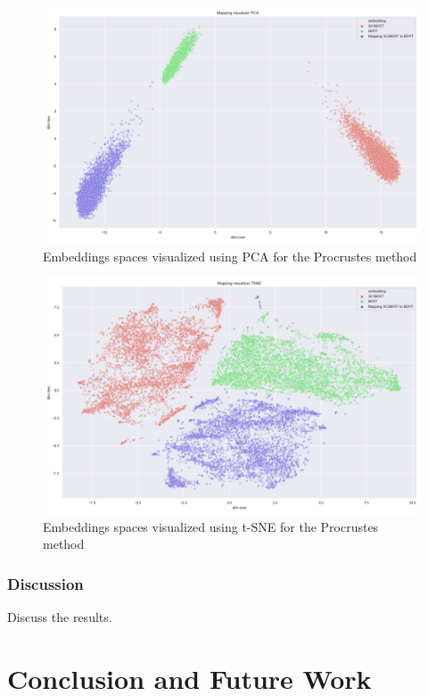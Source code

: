 \documentclass[12pt]{extreport}
\begin{document}
\begin{figure}[ht!]
\centering
\includegraphics[width=0.8\linewidth]{assets/addressing-change/mapping_vis_pca_SCIBERT_BERT_average.png}
\caption{Embeddings spaces visualized using PCA for the Procrustes method}
\label{fig:proc-pca}
\end{figure}

\begin{figure}[ht!]
\centering
\includegraphics[width=0.8\linewidth]{assets/addressing-change/mapping_vis_tsne_SCIBERT_BERT_average.png}
\caption{Embeddings spaces visualized using t-SNE for the Procrustes method}
\label{fig:proc-tsne}
\end{figure}

\subsection{Discussion}

Discuss the results.

\chapter{Conclusion and Future Work}



\end{document}
